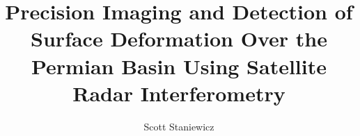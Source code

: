 \documentclass{utexasthesis}
\title{Precision Imaging and Detection of Surface Deformation Over the Permian Basin Using Satellite Radar Interferometry }
\author{Scott Staniewicz}
\begin{document}
\maketitle

\begin{dedication}


\end{dedication}


\begin{acknowledgments}

\end{acknowledgments}

\begin{abstract}
\end{abstract}

\maketableofcontents

















\pagebreak



\appendix






% 


\makeappendix

 
% 

\end{document}
